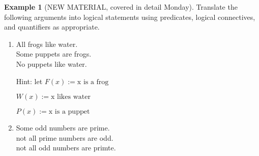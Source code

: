 \documentclass[letterpaper,10pt]{article}
\theoremstyle{plain}
\theoremstyle{definition}
\newtheorem{exmp}[thm]{Example}
\theoremstyle{remark}
\begin{document}
\begin{exmp}[NEW MATERIAL, covered in detail Monday]
  Translate the following arguments into logical statements using predicates, logical connectives, and quantifiers as appropriate.

  \begin{enumerate}
  \item
    All frogs like water.\\
    Some puppets are frogs.\\
    No puppets like water.
    
    Hint: let 
    $F(x):=\text{x is a frog}$
    
    $W(x):=\text{x likes water}$
    
    $P(x):=\text{x is a puppet}$
    \vspace{3cm}

  \item
    Some odd numbers are prime.\\
    not all prime numbers are odd.\\
    not all odd numbers are primte.\\
    \vspace{3cm}

    
  \end{enumerate}

\end{exmp}
\end{document}
